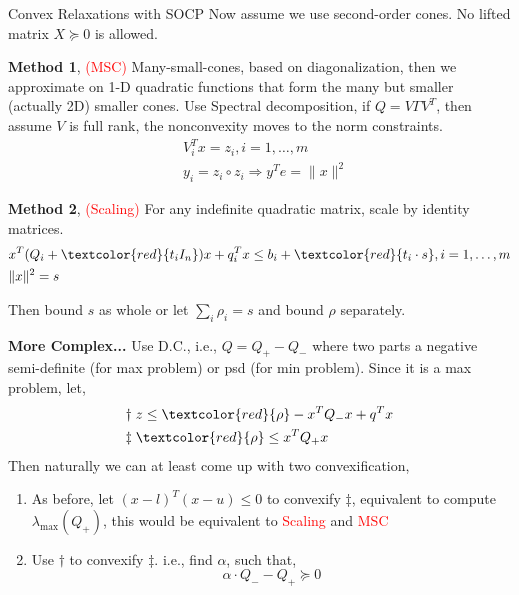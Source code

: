 \documentclass[aspectratio=1612, 10pt]{beamer}
\newcommand{\red}[1]{\textcolor{red}{#1}}
\begin{document}
\begin{frame}[allowframebreaks]{Convex Relaxations with SOCP}
  Now assume we use second-order cones. No lifted matrix \(X \succeq 0\) is allowed.

  \textbf{Method 1}, \textcolor{red}{(MSC)} Many-small-cones, based on diagonalization, then we approximate on 1-D quadratic functions that form the many but smaller (actually 2D) smaller cones.
  Use Spectral decomposition, if \(Q = V\Gamma V^T\), then assume \(V\) is full rank, the nonconvexity moves to the norm constraints.
  \begin{equation}\label{eq:primal.msc}
    \begin{aligned}
       & V_i^Tx = z_i,i= 1,\dots, m                     \\
       & y_i = z_i \circ z_i \Rightarrow y^Te = \|x\|^2
    \end{aligned}
  \end{equation}

  \textbf{Method 2}, \textcolor{red}{(Scaling)} For any indefinite quadratic matrix, scale by identity matrices.
  \begin{equation}\label{eq:primal.scale}
    \begin{aligned}
       & x^T(Q_i+ \textcolor{red}{t_i I_n}) x+ q_i^T x \leq b_i+ \textcolor{red}{t_i \cdot s},i= 1,\dots, m \\
       & \|x\|^2= s
    \end{aligned}
  \end{equation}

  Then bound \(s\) as whole or let \(\sum_i \rho_i = s\) and bound \(\rho\) separately.
  \framebreak

  \textbf{More Complex...} Use D.C., i.e., \(Q = Q_+ - Q_-\) where two parts a negative semi-definite (for max problem) or psd (for min problem).
  Since it is a max problem, let,
  \begin{align*}
    \dagger\;  & z \le \textcolor{red}{\rho} - x^TQ_-x + q^Tx \\
    \ddagger\; & \red{\rho} \le x^TQ_+x                       \\
  \end{align*}
  Then naturally we can at least come up with two convexification,
  \begin{enumerate}
    \item As before, let \((x-l)^T(x-u) \le 0\) to convexify \(\ddagger\), equivalent to compute \(\lambda_{\max}(Q_+)\), this would be equivalent to \red{Scaling} and \red{MSC}
    \item Use \(\dagger\) to convexify \(\ddagger\). i.e., find \(\alpha\), such that,
          \begin{equation*}
            \alpha \cdot Q_- - Q_+ \succeq 0
          \end{equation*}
  \end{enumerate}


\end{frame}
\end{document}
